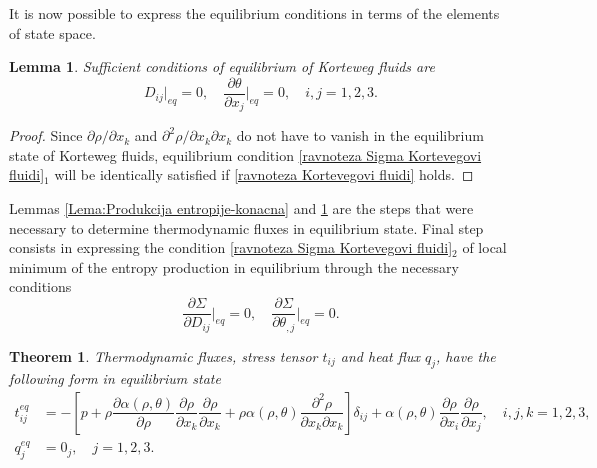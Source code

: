 \documentclass[a4paper,fleqn]{cas-sc}
\newtheorem{theorem}{Theorem}[section]
\newtheorem{lemma}{Lemma}[section]
\theoremstyle{definition}
\begin{document}
It is now possible to express the equilibrium conditions in terms of the elements of state space.

\begin{lemma} \label{Lema:Ravnoteza Kortevegovih fluida}
	Sufficient conditions of equilibrium of Korteweg fluids are 
	\begin{equation} \label{ravnoteza Kortevegovi fluidi}
		D_{ij}|_{eq} = 0, \quad \dfrac{\partial \theta}{\partial x_{j}}\bigg|_{eq} = 0, 
		\quad i,j = 1,2,3.  
	\end{equation}
\end{lemma}
\begin{proof}
	Since $\partial \rho/\partial x_k$ and $\partial^{2} \rho/\partial x_k \partial x_k$ do not have to vanish in the equilibrium state of Korteweg fluids, equilibrium condition \eqref{ravnoteza Sigma Kortevegovi fluidi}$_{1}$ will be identically satisfied if \eqref{ravnoteza Kortevegovi fluidi} holds. 
\end{proof}

Lemmas \ref{Lema:Produkcija entropije-konacna} and \ref{Lema:Ravnoteza Kortevegovih fluida} are the steps that were necessary to determine thermodynamic fluxes in equilibrium state. Final step consists in expressing the condition \eqref{ravnoteza Sigma Kortevegovi fluidi}$_{2}$ of local minimum of the entropy production in equilibrium through the necessary conditions  
\begin{equation} \label{stacionarnost Kortevegovi fluidi} 
	\dfrac{\partial \Sigma}{\partial D_{ij}} \bigg|_{eq} = 0, \quad 
	\dfrac{\partial \Sigma}{\partial \theta_{,j}} \bigg|_{eq} = 0.
\end{equation}

\begin{theorem} \label{Te:Ravnotezni protoci}
	Thermodynamic fluxes, stress tensor $t_{ij}$ and heat flux $q_{j}$, have the following form in equilibrium state 
	\begin{align} 
		\label{tenzor napona equilibrium Kortevegovi fluidi}
		t_{ij}^{eq} & = - \left[ p + \rho \dfrac{\partial \alpha(\rho,\theta)}{\partial\rho} 
		\dfrac{\partial\rho}{\partial x_k} \dfrac{\partial\rho}{\partial x_k} 
		+ \rho \alpha(\rho,\theta) \dfrac{\partial^2\rho}{\partial x_k\partial x_k} \right] \delta_{ij} 
		+ \alpha(\rho,\theta) \dfrac{\partial\rho}{\partial x_i} \dfrac{\partial\rho}{\partial x_j}, 
		\quad i,j,k = 1,2,3,
		\\
		\label{toplotni protok equilibrium Kortevegovi fluidi}
		q_{j}^{eq} & = 0_{j}, \quad j = 1,2,3.
	\end{align}
\end{theorem}
\end{document}
